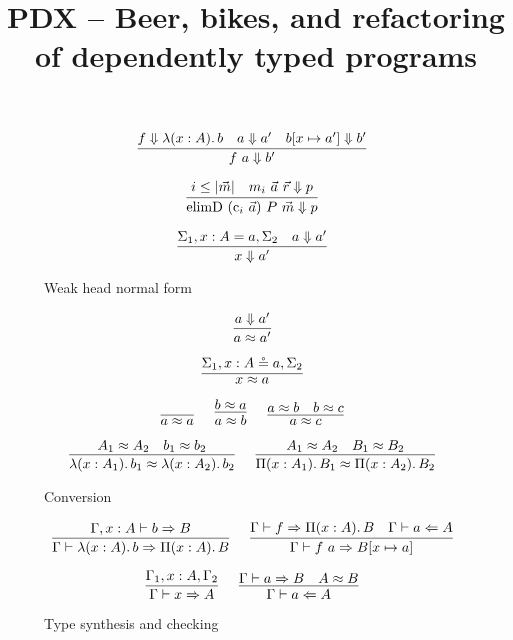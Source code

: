 \documentclass{article}
\title{PDX -- Beer, bikes, and refactoring of dependently typed programs}
\begin{document}
\maketitle

\begin{figure}[h]
\caption{Weak head normal form}

$$
\infer
  []
  {\whnf{\app{f}{a}}{b'}}
{
  \whnf{f}{\lam{x}{A}{b}}
  &
  \whnf{a}{a'}
  &
  \whnf{\sub{b}{x}{a'}}{b'}
}
$$

$$
\infer
  []
  {\whnf{\con{elimD}~(\con{c}_i~\vec{a})~P~\vec{m}}{p}}
{
  i \leq |\vec{m}|
  &
  \whnf{m_i~\vec{a}~\vec{r}}{p}
}
$$


$$
\infer
  []
  {\whnf{x}{a'}}
{
  \Sigma_1, \sigd{x}{A}{a}, \Sigma_2
  &
  \whnf{a}{a'}
}
$$

\end{figure}

\begin{figure}[h]
\caption{Conversion}

$$
\infer
  []
  {\conv{a}{a'}}
{
  \whnf{a}{a'}
}
$$

$$
\infer
  []
  {\conv{x}{a}}
{
  \Sigma_1, \sigr{x}{A}{a}, \Sigma_2
}
$$

$$
\infer
  []
  {\conv{a}{a}}
{
}
\quad
\infer
  []
  {\conv{a}{b}}
{
  \conv{b}{a}
}
\quad
\infer
  []
  {\conv{a}{c}}
{
  \conv{a}{b}
  &
  \conv{b}{c}
}
$$

$$
\infer
  []
  {\conv{\lam{x}{A_1}{b_1}}{\lam{x}{A_2}{b_2}}}
{
  \conv{A_1}{A_2}
  &
  \conv{b_1}{b_2}
}
\quad
\infer
  []
  {\conv{\pie{x}{A_1}{B_1}}{\pie{x}{A_2}{B_2}}}
{
  \conv{A_1}{A_2}
  &
  \conv{B_1}{B_2}
}
$$


\end{figure}

\begin{figure}[h]
\caption{Type synthesis and checking}

$$
\infer
  []
  {\synthG{\lam{x}{A}{b}}{\pie{x}{A}{B}}}
{
  \synth{\Gamma, x : A}{b}{B}
}
\quad
\infer
  []
  {\synthG{\app{f}{a}}{\sub{B}{x}{a}}}
{
  \synthG{f}{\pie{x}{A}{B}}
  &
  \chekG{a}{A}
}
$$

$$
\infer
  []
  {\synthG{x}{A}}
{
  \Gamma_1, x : A, \Gamma_2
}
\quad
\infer
  []
  {\chekG{a}{A}}
{
  \synthG{a}{B}
  &
  \conv{A}{B}
}
$$

\end{figure}
\end{document}
